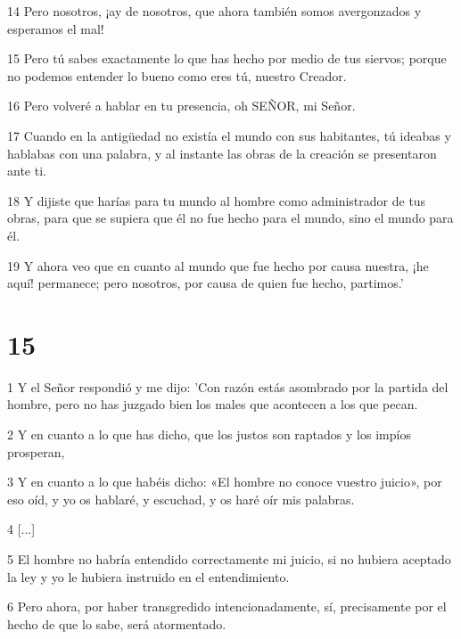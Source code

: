 \par 14 Pero nosotros, ¡ay de nosotros, que ahora también somos avergonzados y esperamos el mal!

\par 15 Pero tú sabes exactamente lo que has hecho por medio de tus siervos; porque no podemos entender lo bueno como eres tú, nuestro Creador.

\par 16 Pero volveré a hablar en tu presencia, oh SEÑOR, mi Señor.

\par 17 Cuando en la antigüedad no existía el mundo con sus habitantes, tú ideabas y hablabas con una palabra, y al instante las obras de la creación se presentaron ante ti.

\par 18 Y dijiste que harías para tu mundo al hombre como administrador de tus obras, para que se supiera que él no fue hecho para el mundo, sino el mundo para él.

\par 19 Y ahora veo que en cuanto al mundo que fue hecho por causa nuestra, ¡he aquí! permanece; pero nosotros, por causa de quien fue hecho, partimos.'

\chapter{15}

\par 1 Y el Señor respondió y me dijo: 'Con razón estás asombrado por la partida del hombre, pero no has juzgado bien los males que acontecen a los que pecan.

\par 2 Y en cuanto a lo que has dicho, que los justos son raptados y los impíos prosperan,

\par 3 Y en cuanto a lo que habéis dicho: «El hombre no conoce vuestro juicio», por eso oíd, y yo os hablaré, y escuchad, y os haré oír mis palabras.

\par 4 [...]

\par 5 El hombre no habría entendido correctamente mi juicio, si no hubiera aceptado la ley y yo le hubiera instruido en el entendimiento.

\par 6 Pero ahora, por haber transgredido intencionadamente, sí, precisamente por el hecho de que lo sabe, será atormentado.

